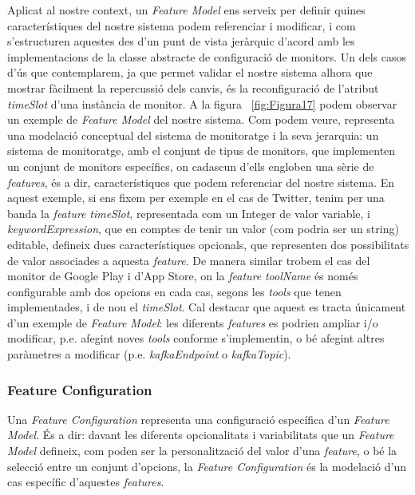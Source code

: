 Aplicat al nostre context, un \textit{Feature Model} ens serveix per definir quines característiques del nostre sistema podem referenciar i modificar, i com s'estructuren aquestes des d'un punt de vista jeràrquic d'acord amb les implementacions de la classe abstracte de configuració de monitors. Un dels casos d'ús que contemplarem, ja que permet validar el nostre sistema alhora que mostrar fàcilment la repercussió dels canvis, és la reconfiguració de l'atribut \textit{timeSlot} d'una instància de monitor. A la figura ~\ref{fig:Figura17} podem observar un exemple de \textit{Feature Model} del nostre sistema. Com podem veure, representa una modelació conceptual del sistema de monitoratge i la seva jerarquia: un sistema de monitoratge, amb el conjunt de tipus de monitors, que implementen un conjunt de monitors específics, on cadascun d'ells engloben una sèrie de \textit{features}, és a dir, característiques que podem referenciar del nostre sistema. En aquest exemple, si ens fixem per exemple en el cas de Twitter, tenim per una banda la \textit{feature} \textit{timeSlot}, representada com un Integer de valor variable, i \textit{keywordExpression}, que en comptes de tenir un valor (com podria ser un string) editable, defineix dues característiques opcionals, que representen dos possibilitats de valor associades a aquesta \textit{feature}. De manera similar trobem el cas del monitor de Google Play i d'App Store, on la \textit{feature} \textit{toolName} és només configurable amb dos opcions en cada cas, segons les \textit{tools} que tenen implementades, i de nou el \textit{timeSlot}. Cal destacar que aquest es tracta únicament d'un exemple de \textit{Feature Model}: les diferents \textit{features} es podrien ampliar i/o modificar, p.e. afegint noves \textit{tools} conforme s'implementin, o bé afegint altres paràmetres a modificar (p.e. \textit{kafkaEndpoint} o \textit{kafkaTopic}).

\subsubsection{Feature Configuration}

Una \textit{Feature Configuration} representa una configuració específica d'un \textit{Feature Model}. És a dir: davant les diferents opcionalitats i variabilitats que un \textit{Feature Model} defineix, com poden ser la personalització del valor d'una \textit{feature}, o bé la selecció entre un conjunt d'opcions, la \textit{Feature Configuration} és la modelació d'un cas específic d'aquestes \textit{features}.\\

